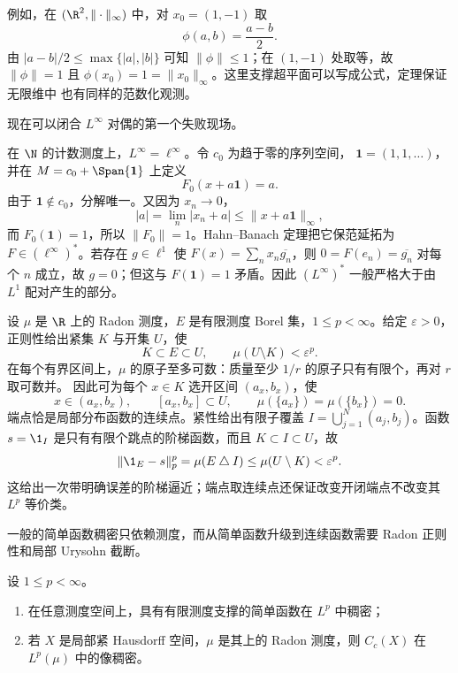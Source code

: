 例如，在 $(\R^2,\|\cdot\|_\infty)$ 中，对 $x_0=(1,-1)$ 取
\[
  \phi(a,b)=\frac{a-b}{2}.
\]
由 $|a-b|/2\le\max\{|a|,|b|\}$ 可知 $\|\phi\|\le1$；在 $(1,-1)$ 处取等，故
$\|\phi\|=1$ 且 $\phi(x_0)=1=\|x_0\|_\infty$。这里支撑超平面可以写成公式，定理保证无限维中
也有同样的范数化观测。

现在可以闭合 $L^\infty$ 对偶的第一个失败现场。

\begin{example}\label{ex:3-3-3-3}
在 $\N$ 的计数测度上，$L^\infty=\ell^\infty$。令 $c_0$ 为趋于零的序列空间，
$\mathbf1=(1,1,\ldots)$，并在
$M=c_0+\Span\{\mathbf1\}$ 上定义
\[
  F_0(x+a\mathbf1)=a.
\]
由于 $\mathbf1\notin c_0$，分解唯一。又因为 $x_n\to0$，
\[
 |a|=\lim_n|x_n+a|\le\|x+a\mathbf1\|_\infty,
\]
而 $F_0(\mathbf1)=1$，所以 $\|F_0\|=1$。Hahn--Banach 定理把它保范延拓为
$F\in(\ell^\infty)^*$。若存在 $g\in\ell^1$ 使
$F(x)=\sum_nx_n\overline{g_n}$，则
$0=F(e_n)=\overline{g_n}$ 对每个 $n$ 成立，故 $g=0$；但这与
$F(\mathbf1)=1$ 矛盾。因此 $(L^\infty)^*$ 一般严格大于由 $L^1$ 配对产生的部分。
\end{example}

\begin{example}[阶梯函数]\label{ex:3-3-3-1}
设 $\mu$ 是 $\R$ 上的 Radon 测度，$E$ 是有限测度 Borel 集，$1\le p<\infty$。给定
$\varepsilon>0$，正则性给出紧集 $K$ 与开集 $U$，使
\[
  K\subset E\subset U,
  \qquad \mu(U\setminus K)<\varepsilon^p.
\]
在每个有界区间上，$\mu$ 的原子至多可数：质量至少 $1/r$ 的原子只有有限个，再对 $r$ 取可数并。
因此可为每个 $x\in K$ 选开区间 $(a_x,b_x)$，使
\[
  x\in(a_x,b_x),
  \qquad [a_x,b_x]\subset U,
  \qquad \mu(\{a_x\})=\mu(\{b_x\})=0.
\]
端点恰是局部分布函数的连续点。紧性给出有限子覆盖
$I=\bigcup_{j=1}^N(a_j,b_j)$。函数 $s=\1_I$ 是只有有限个跳点的阶梯函数，而且
$K\subset I\subset U$，故
\[
  \|\1_E-s\|_p^p
  =\mu(E\mathbin{\triangle} I)
  \le\mu(U\setminus K)<\varepsilon^p.
\]
这给出一次带明确误差的阶梯逼近；端点取连续点还保证改变开闭端点不改变其 $L^p$ 等价类。
\end{example}

一般的简单函数稠密只依赖测度，而从简单函数升级到连续函数需要 Radon 正则性和局部 Urysohn
截断。

\begin{theorem}[简单函数与 $C_c$ 稠密]\label{theorem:3-3-3-1}
设 $1\le p<\infty$。
\begin{enumerate}
  \item 在任意测度空间上，具有有限测度支撑的简单函数在 $L^p$ 中稠密；
  \item 若 $X$ 是局部紧 Hausdorff 空间，$\mu$ 是其上的 Radon 测度，则
        $C_c(X)$ 在 $L^p(\mu)$ 中的像稠密。
\end{enumerate}
\end{theorem}

